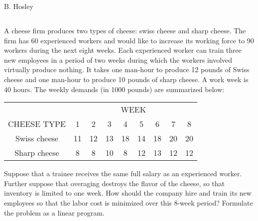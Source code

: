 \documentclass[12pt]{amsart}
\begin{document}
\raggedbottom

\hspace{\fill} {\large B. Hosley}
\bigskip


\setcounter{section}{1}
\setcounter{subsection}{5}
\subsection{}

A cheese firm produces two types of cheese: swiss cheese and sharp cheese. The firm has 60 experienced workers and would like to increase its working force to 90 workers during the next eight weeks. Each experienced worker can train three new employees in a period of two weeks during which the workers involved virtually produce nothing. It takes one man-hour to produce 12 pounds of Swiss cheese and one man-hour to produce 10 pounds of sharp cheese. A work week is 40 hours. The weekly demands (in 1000 pounds) are summarized below: \\

\begin{center}
	\begin{tabular}{ccccccccc}
		\toprule
		 & \multicolumn{8}{c}{WEEK} \\
		\cmidrule(lr){2-9}
		CHEESE TYPE  & 1  & 2  & 3  & 4  & 5  & 6  & 7  & 8  \\
		\midrule
		Swiss cheese & 11 & 12 & 13 & 18 & 14 & 18 & 20 & 20 \\ 
		Sharp cheese & 8  & 8  & 10 & 8  & 12 & 13 & 12 & 12 \\
		\bottomrule
	\end{tabular}
\end{center}
\bigskip

Suppose that a trainee receives the same full salary as an experienced worker. Further suppose that overaging destroys the flavor of the cheese, so that inventory is limited to one week. How should the company hire and train its new employees so that the labor cost is minimized over this 8-week period? Formulate the problem as a linear program.
\end{document}
